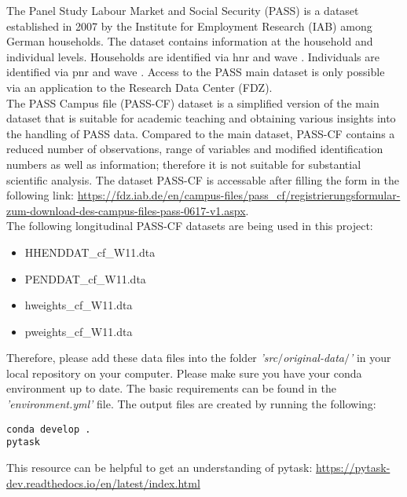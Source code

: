 \documentclass[11pt, a4paper, leqno]{article}
\begin{document}
The Panel Study Labour Market and Social Security (PASS) is a dataset established in 2007 by the Institute for Employment Research (IAB) among German households. The dataset contains information at the household and individual levels. Households are identified via  hnr  and  wave . Individuals are identified via  pnr  and  wave . Access to the PASS main dataset is only possible via an application to the Research Data Center (FDZ).\\[12pt]
The PASS Campus file (PASS-CF) dataset is a simplified version of the main dataset that is suitable for academic teaching and obtaining various insights into the handling of PASS data. Compared to the main dataset, PASS-CF contains a reduced number of observations, range of variables and modified identification numbers as well as information; therefore it is not suitable for substantial scientific analysis. The dataset PASS-CF is accessable after filling the form in the following link: \url{https://fdz.iab.de/en/campus-files/pass_cf/registrierungsformular-zum-download-des-campus-files-pass-0617-v1.aspx}. \\[12pt]
The following longitudinal PASS-CF datasets are being used in this project:
\begin{itemize}
  \item HHENDDAT\_cf\_W11.dta
  \item PENDDAT\_cf\_W11.dta
  \item hweights\_cf\_W11.dta
  \item pweights\_cf\_W11.dta
\end{itemize}
Therefore, please add these data files into the folder \emph{'src$/$original-data$/$'} in your local repository on your computer. Please make sure you have your conda environment up to date. The basic requirements can be found in the \emph{'environment.yml'} file. The output files are created by running the following:

\begin{lstlisting}
conda develop .
pytask
\end{lstlisting}

This resource can be helpful to get an understanding of pytask: \url{https://pytask-dev.readthedocs.io/en/latest/index.html}
\end{document}
